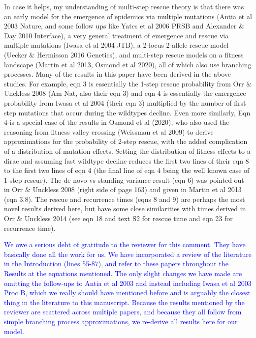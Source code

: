 \documentclass[12pt]{extarticle}
\begin{document}
In case it helps, my understanding of multi-step rescue theory is that there was an early model for the emergence of epidemics via multiple mutations (Antia et al 2003 Nature, and some follow ups like Yates et al 2006 PRSB and Alexander $\&$ Day 2010 Interface), a very general treatment of emergence and rescue via multiple mutations (Iwasa et al 2004 JTB), a 2-locus 2-allele rescue model (Uecker $\&$ Hermisson 2016 Genetics), and multi-step rescue models on a fitness landscape (Martin et al 2013, Osmond et al 2020), all of which also use branching processes. Many of the results in this paper have been derived in the above studies. For example, eqn 3 is essentially the 1-step rescue probability from Orr $\&$ Unckless 2008 (Am Nat, also their eqn 3) and eqn 4 is essentially the emergence probability from Iwasa et al 2004 (their eqn 3) multiplied by the number of first step mutations that occur during the wildtypes decline. Even more similarly, Eqn 4 is a special case of the results in Osmond et al (2020), who also used the reasoning from fitness valley crossing (Weissman et al 2009) to derive approximations for the probability of 2-step rescue, with the added complication of a distribution of mutation effects. Setting the distribution of fitness effects to a dirac and assuming fast wildtype decline reduces the first two lines of their eqn 8 to the first two lines of eqn 4 (the final line of eqn 4 being the well known case of 1-step rescue). The de novo vs standing variance result (eqn 6) was pointed out in Orr $\&$ Unckless 2008 (right side of page 163) and given in Martin et al 2013 (eqn 3.8). The rescue and recurrence times (eqns 8 and 9) are perhaps the most novel results derived here, but have some close similarities with times derived in Orr $\&$ Unckless 2014 (see eqn 18 and text S2 for rescue time and eqn 23 for recurrence time).

\textcolor{blue}{
We owe a serious debt of gratitude to the reviewer for this comment. They have basically done all the work for us. We have incorporated a review of the literature in the Introduction (lines 55-87), and refer to these papers throughout the Results at the equations mentioned. The only slight changes we have made are omitting the follow-ups to Antia et al 2003 and instead including Iwasa et al 2003 Proc B, which we really should have mentioned before and is arguably the closest thing in the literature to this manuscript.
Because the results mentioned by the reviewer are scattered across multiple papers, and because they all follow from simple branching
process approximations, we re-derive all results here for our model.
} 
\end{document}
